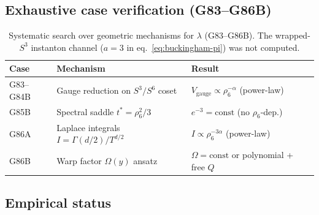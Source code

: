 \documentclass[12pt,a4paper]{article}
\begin{document}
\subsection{Exhaustive case verification (G83--G86B)}

\begin{table}[h]
\centering
\begin{tabular}{@{}lll@{}}
\toprule
Case & Mechanism & Result \\
\midrule
G83--G84B & Gauge reduction on $S^3/S^6$ coset & $V_{\mathrm{gauge}}\propto\rho_6^{-\alpha}$ (power-law) \\
G85B & Spectral saddle $t^*=\rho_6^2/3$ & $e^{-3}=\mathrm{const}$ (no $\rho_6$-dep.) \\
G86A & Laplace integrals $I=\Gamma(d/2)/T^{d/2}$ & $I\propto\rho_6^{-3\alpha}$ (power-law) \\
G86B & Warp factor $\Omega(y)$ ansatz & $\Omega=\mathrm{const}$ or polynomial + free $Q$ \\
\bottomrule
\end{tabular}
\caption{Systematic search over geometric mechanisms for $\lambda$ (G83--G86B). The wrapped-$S^3$ instanton channel ($a=3$ in eq.~\eqref{eq:buckingham-pi}) was not computed.}
\label{tab:lambda-cases}
\end{table}

\subsection{Empirical status}
\end{document}
